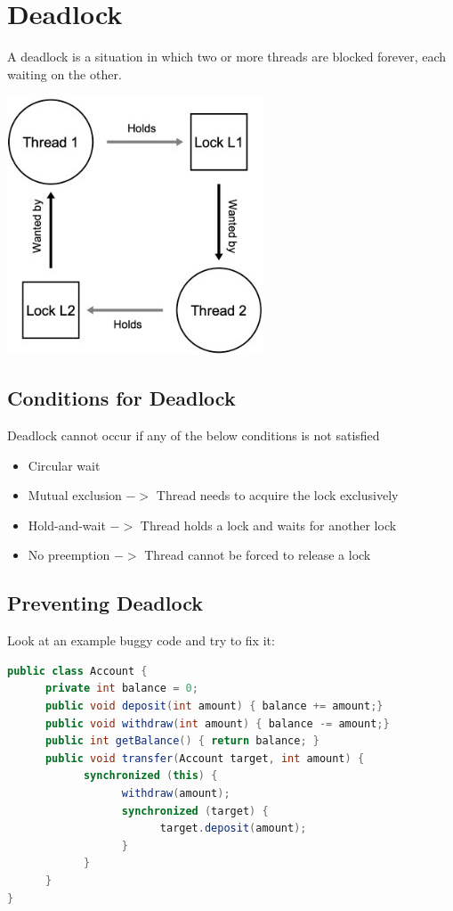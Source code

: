 \documentclass[letterpaper,12pt]{article}
\begin{document}
\section{Deadlock}
A deadlock is a situation in which two or more threads are blocked forever, each waiting on the other.

\includegraphics*[scale=0.7]{./summary_image/Deadlock Illustration.jpg}

\subsection{Conditions for Deadlock}
Deadlock cannot occur if any of the below conditions is not satisfied
\begin{itemize}
      \item Circular wait
      \item Mutual exclusion $->$ Thread needs to acquire the lock exclusively
      \item Hold-and-wait $->$ Thread holds a lock and waits for another lock
      \item No preemption $->$ Thread cannot be forced to release a lock
\end{itemize}
\subsection{Preventing Deadlock}
Look at an example buggy code and try to fix it:
\begin{lstlisting}[language=Java]
public class Account {
      private int balance = 0;
      public void deposit(int amount) { balance += amount;}
      public void withdraw(int amount) { balance -= amount;}
      public int getBalance() { return balance; }
      public void transfer(Account target, int amount) {
            synchronized (this) {
                  withdraw(amount);
                  synchronized (target) {
                        target.deposit(amount);
                  }
            }
      }
}       
\end{lstlisting}
\end{document}
